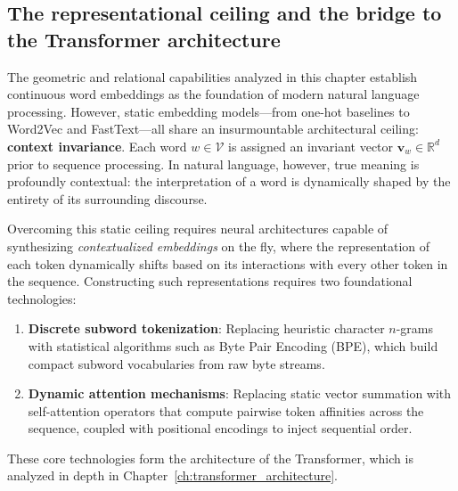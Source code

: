 \documentclass[../../main.tex]{subfiles}
\begin{document}
\clearpage



\subsection{The representational ceiling and the bridge to the Transformer architecture}
\label{subsec:bridge_to_transformer}

The geometric and relational capabilities analyzed in this chapter establish continuous word embeddings as the foundation of modern natural language processing. However, static embedding models—from one-hot baselines to Word2Vec and FastText—all share an insurmountable architectural ceiling: \textbf{context invariance}. Each word $w \in \mathcal{V}$ is assigned an invariant vector $\mathbf{v}_w \in \mathbb{R}^d$ prior to sequence processing. In natural language, however, true meaning is profoundly contextual: the interpretation of a word is dynamically shaped by the entirety of its surrounding discourse.

Overcoming this static ceiling requires neural architectures capable of synthesizing \textit{contextualized embeddings} on the fly, where the representation of each token dynamically shifts based on its interactions with every other token in the sequence. Constructing such representations requires two foundational technologies:
\begin{enumerate}
    \item \textbf{Discrete subword tokenization}: Replacing heuristic character $n$-grams with statistical algorithms such as Byte Pair Encoding (BPE), which build compact subword vocabularies from raw byte streams.
    \item \textbf{Dynamic attention mechanisms}: Replacing static vector summation with self-attention operators that compute pairwise token affinities across the sequence, coupled with positional encodings to inject sequential order.
\end{enumerate}
These core technologies form the architecture of the Transformer, which is analyzed in depth in Chapter~\ref{ch:transformer_architecture}.


\clearpage\thispagestyle{empty}\null\clearpage
\end{document}
